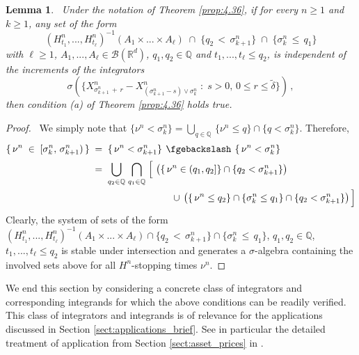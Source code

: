 \documentclass[11pt]{article}
\newtheorem{lem}[theorem]{Lemma}
\theoremstyle{definition}\newtheorem{example}[theorem]{Example}
\theoremstyle{definition}\newtheorem{counterexample}[theorem]{Counterexample}
\theoremstyle{definition}\newtheorem{remark}[theorem]{Remark}
\theoremstyle{definition}\newtheorem{defi}[theorem]{Definition}
\numberwithin{equation}{section}
\newcommand{\R}{\mathbb{R}}
\newcommand{\Q}{\mathbb{Q}}
\newcommand{\B}{\mathscr{B}}
\renewcommand{\setminus}{\mathbin{\fgebackslash}}						%
\newcommand{\union}[2]{\overset{#2}{\bigcup\limits_{#1}}\;}					%
\newcommand{\intersection}[2]{\overset{#2}{\bigcap\limits_{#1}}\;}				%
\renewcommand{\|}{\; : \, \;}											%
\begin{document}
\begin{lem}\ \label{lem:4.43} 
	Under the notation of Theorem \ref{prop:4.36}, if for every $n\ge 1$ and $k\ge 1$, any set of the form
	$$ (H^n_{t_1},...,H^n_{t_\ell})^{-1}(A_1\times...\times  A_\ell)\; \cap \; \{ q_2 \, < \, \sigma^{n}_{k+1}\}\; \cap \; \{\sigma^n_k \, \le \, q_1\} $$
	with $\ell \ge 1$, $A_1,...,A_\ell \in \B(\R^d)$, $q_1,q_2 \in \Q$ and $t_1,...,t_\ell\le q_2$, is independent of the increments of the integrators
	$$ \sigma \left(\{X^n_{\sigma^{n}_{k+1} \, + \, r} - X^n_{(\sigma^{n}_{k+1}-s)\vee \sigma^n_{k}} \; : \; s>0, \, 0\le r \le \tilde\delta \}\right) \, ,$$
	then condition (a) of Theorem \ref{prop:4.36} holds true.
\end{lem}
\begin{proof}\ 
	We simply note that $\{  \nu^n  <  \sigma^{n}_{k}  \} = \bigcup_{q \in \Q} \, \{ \nu^n \le q\} \cap \{ q < \sigma^n_{k}\}$. Therefore,
	\begin{align*}
		\{ \, \nu^n \; \in \; [\sigma^n_k, \, \sigma^n_{k+1}) \, \} \; &= \; \{\, \nu^n < \sigma^n_{k+1}\} \, \setminus \, \{\, \nu^n < \sigma^n_{k}\} \\
		&= \; \union{q_2 \in \Q}{} \intersection{q_1 \in \Q} \, \Big[ \, \left( \{\, \nu^n \in (q_1, q_2]\} \cap \{q_2 < \sigma^n_{k+1}\}\right) \\
		&\hspace{2.9cm} \cup \,  \left( \{\, \nu^n \le q_2\} \cap  \{\sigma^n_{k}\le q_1\} \cap \{q_2 < \sigma^n_{k+1}\}\right) \Big]
	\end{align*}
	Clearly, the system of sets of the form $(H^n_{t_1},...,H^n_{t_\ell})^{-1}(A_1\times...\times A_\ell) \cap  \{ q_2 \, < \, \sigma^{n}_{k+1}\} \cap \{\sigma^n_k \, \le \, q_1\}$, $q_1,q_2 \in \Q$, $t_1,...,t_\ell \le q_2$ is stable under intersection and generates a $\sigma$-algebra containing the involved sets above for all $H^n$-stopping times $\nu^n$.
\end{proof}


We end this section by considering a concrete class of integrators and corresponding integrands for which the above conditions can be readily verified. This class of integrators and integrands is of relevance for the applications discussed in Section \ref{sect:applications_brief}. See in particular the detailed treatment of application from Section \ref{sect:asset_prices} in \cite{andreasfabrice}.
\end{document}
